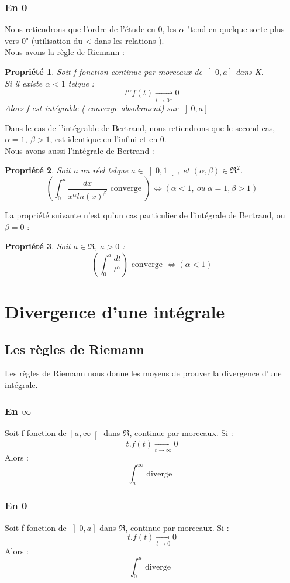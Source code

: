 \documentclass[a4paper,12 pt,oneside]{report}     %
\newtheorem{prop}{Propriété}
\begin{document}
\subsubsection{En 0}
Nous retiendrons que l'ordre de l'étude en 0, les $\alpha$ "tend en quelque sorte plus vers 0" (utilisation du < dans les relations ).\\
Nous avons la règle de Riemann :
\begin{prop}
Soit f fonction continue par morceaux de $\left]0,a\right]$ dans K.\\
Si il existe $\alpha < 1$ telque : 
$$t^{\alpha}f(t) \underset{t \rightarrow 0^+}\rightarrow 0$$
Alors f est intégrable ( converge absolument) sur $\left]0,a\right]$
\end{prop}
Dans le cas de l'intégralde de Bertrand, nous retiendrons que le second cas, $\alpha =1,~ \beta > 1$, est identique en l'infini et en 0.\\
Nous avons aussi l'intégrale de Bertrand : 
\begin{prop}
Soit a un réel telque $a \in \left]0,1\right[$, et $(\alpha,\beta) \in \Re^2$.
$$\left(\int_0^a \dfrac{dx}{x^{\alpha}ln(x)^{\beta}} \mbox{ converge }\right) \Leftrightarrow ( \alpha < 1 ,~ ou~ \alpha=1,\beta>1)$$
\end{prop}
La propriété suivante n'est qu'un cas particulier de l'intégrale de Bertrand, ou $\beta = 0$ :
\begin{prop}
Soit $a \in \Re$, $a>0$ :
$$\left(\int_0^a \dfrac{dt}{t^{\alpha}}\right) \mbox{ converge } \Leftrightarrow (\alpha < 1)$$
\end{prop}
\section{Divergence d'une intégrale}
\subsection{Les règles de Riemann}
Les règles de Riemann nous donne les moyens de prouver la divergence d'une intégrale.
\subsubsection{En $\infty$}
Soit f fonction de $\left[a,\infty\right[$ dans $\Re$, continue par morceaux. Si :
$$t.f(t) \underset{t\rightarrow\infty}\rightarrow 0$$
Alors :
$$\int_a^{\infty} \mbox{ diverge }$$
\subsubsection{En 0}
Soit f fonction de $\left]0,a\right]$ dans $\Re$, continue par morceaux. Si :
$$t.f(t) \underset{t\rightarrow 0}\rightarrow 0$$
Alors :
$$\int_0^a \mbox{ diverge }$$
\end{document}
